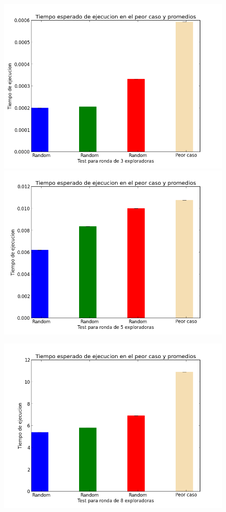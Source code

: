 \documentclass[11pt]{article}
\begin{document}
      \begin{figure}[h]
        \includegraphics[scale=0.40]{peorCaso3}
        \includegraphics[scale=0.40]{peorCaso5}
        \begin{center}
        \includegraphics[scale=0.4]{peorCaso8}
        \end{center}
        \end{figure}
\end{document}
